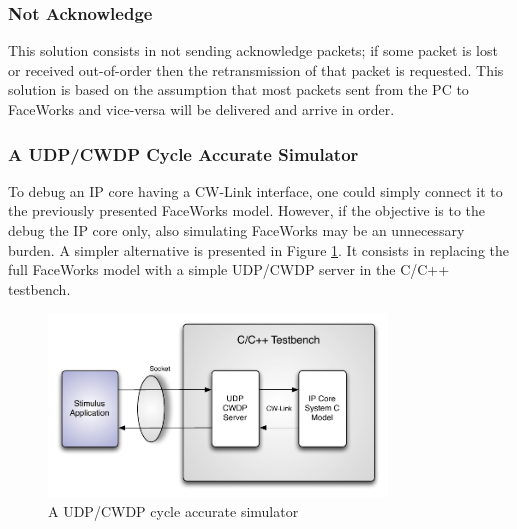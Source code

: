 \documentclass[conference]{IEEEtran}
\begin{document}
\subsubsection{Not Acknowledge}

This solution consists in not sending acknowledge packets; if some packet is lost or received out-of-order then the retransmission of that packet is requested. This solution is based on the assumption that most packets sent from the PC to FaceWorks and vice-versa will be delivered and arrive in order.

\subsubsection{A UDP/CWDP Cycle Accurate Simulator}

To debug an IP core having a CW-Link interface, one could simply connect it to the previously presented FaceWorks model. However, if the objective is to the debug the IP core only, also simulating FaceWorks may be an unnecessary burden.
A simpler alternative is presented in Figure \ref{fig:udpserver}. It consists in replacing the full FaceWorks model with a simple UDP/CWDP server in the C/C++ testbench.

\begin{figure}[h]
  \centering
      \includegraphics[width=9cm,center]{Diagrams/Simp-Diag.pdf}
  \caption{A UDP/CWDP cycle accurate simulator}\label{fig:udpserver}
\end{figure}








\end{document}
